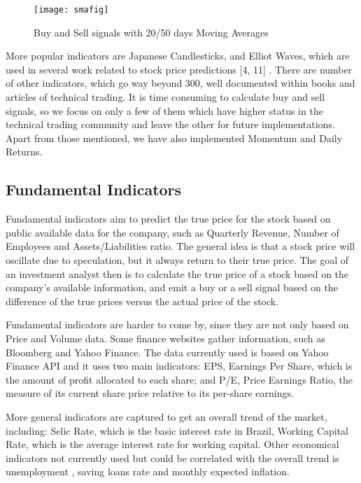 \documentclass[prodmode,acmtecs]{acmsmall} %
\begin{document}
\begin{figure}
	\centering
	\texttt{[image: smafig]}
	\caption{Buy and Sell signals with 20/50 days Moving Averages }
	\label{fig:three}
\end{figure}

More popular indicators are Japanese Candlesticks, and Elliot Waves, which are used in several work related to stock price predictions [4, 11] . There are number of other indicators, which go way beyond 300, well documented within books and articles of technical trading. It is time consuming to calculate buy and sell signals, so we focus on only a few of them which have higher status in the technical trading community and leave the other for future implementations. Apart from those mentioned, we have also implemented Momentum and Daily Returns.

\subsection {Fundamental Indicators}

Fundamental indicators aim to predict the true price for the stock based on public available data for the company, such as Quarterly Revenue, Number of Employees and Assets/Liabilities ratio. The general idea is that a stock price will oscillate due to speculation, but it always return to their true price. The goal of an investment analyst then is to calculate the true price of a stock based on the company’s available information, and emit a buy or a sell signal based on the difference of the true prices versus the actual price of the stock.

Fundamental indicators are harder to come by, since they are not only based on Price and Volume data. Some finance websites gather information, such as Bloomberg and Yahoo Finance. The data currently used is based on Yahoo Finance API and it uses two main indicators: EPS, Earnings Per Share, which is the amount of profit allocated to each share; and P/E, Price Earnings Ratio, the measure of its current share price relative to its per-share earnings.

More general indicators are captured to get an overall trend of the market, including: Selic Rate, which is the basic interest rate in Brazil, Working Capital Rate, which is the average interest rate for working capital. Other economical indicators not currently used but could be correlated with the overall trend is unemployment , saving loans rate and monthly expected inflation.
\end{document}
